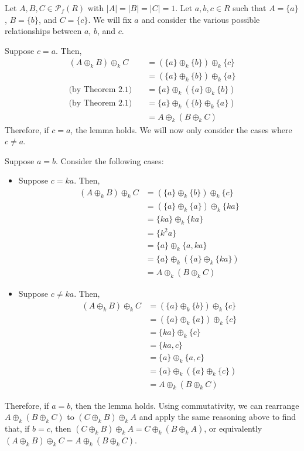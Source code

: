 \documentclass{article}
\newcommand{\abs}[1]{\left|#1\right|}
\begin{document}
Let $A, B, C \in \mathcal{P}_f(R)$
with $\abs{A} = \abs{B} = \abs{C} = 1$.
Let $a, b, c \in R$ such that
$A = \{a\}$, $B = \{b\}$, and $C = \{c\}$.
We will fix $a$ and consider the various possible relationships
between $a$, $b$, and $c$.

Suppose $c = a$. Then,
\[\begin{split}
    (A \oplus_k B) \oplus_k C
    &= (\{a\} \oplus_k \{b\}) \oplus_k \{c\} \\
    &= (\{a\} \oplus_k \{b\}) \oplus_k \{a\} \\
    \text{(by Theorem 2.1)}\quad
    &= \{a\} \oplus_k (\{a\} \oplus_k \{b\}) \\
    \text{(by Theorem 2.1)}\quad
    &= \{a\} \oplus_k (\{b\} \oplus_k \{a\}) \\
    &= A \oplus_k (B \oplus_k C)
\end{split}\]
Therefore, if $c = a$, the lemma holds. We will now only
consider the cases where $c \neq a$.

Suppose $a = b$. Consider the following cases:
\begin{itemize}
    \item Suppose $c = ka$. Then,
    \[\begin{split}
        (A \oplus_k B) \oplus_k C
        &= (\{a\} \oplus_k \{b\}) \oplus_k \{c\} \\
        &= (\{a\} \oplus_k \{a\}) \oplus_k \{ka\} \\
        &= \{ka\} \oplus_k \{ka\} \\
        &= \{k^2a\} \\
        &= \{a\} \oplus_k \{a, ka\} \\
        &= \{a\} \oplus_k (\{a\} \oplus_k \{ka\}) \\
        &= A \oplus_k (B \oplus_k C)
    \end{split}\]
    \item Suppose $c \neq ka$. Then,
    \[\begin{split}
        (A \oplus_k B) \oplus_k C
        &= (\{a\} \oplus_k \{b\}) \oplus_k \{c\} \\
        &= (\{a\} \oplus_k \{a\}) \oplus_k \{c\} \\
        &= \{ka\} \oplus_k \{c\} \\
        &= \{ka, c\} \\
        &= \{a\} \oplus_k \{a, c\} \\
        &= \{a\} \oplus_k (\{a\} \oplus_k \{c\}) \\
        &= A \oplus_k (B \oplus_k C)
    \end{split}\]
\end{itemize}
Therefore, if $a = b$, then the lemma holds.
Using commutativity, we can rearrange $A \oplus_k (B \oplus_k C)$
to $(C \oplus_k B) \oplus_k A$ and apply the same reasoning
above to find that, if $b = c$, then
$(C \oplus_k B) \oplus_k A = C \oplus_k (B \oplus_k A)$,
or equivalently
$(A \oplus_k B) \oplus_k C = A \oplus_k (B \oplus_k C)$.
\end{document}
